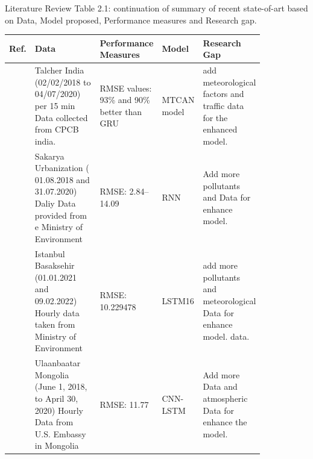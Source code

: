 \documentclass[12pt, aspectratio=169]{beamer}
\begin{document}
\begin{frame}{Literature Review}
	\centering
	\scriptsize {Table 2.1: continuation of summary of recent state-of-art based on Data,  Model proposed,  Performance measures and Research gap.}\\
	\begin{table}
		\centering
		\begin{tabular}{|p{0.03\linewidth}|p{0.29\linewidth}|p{0.15\linewidth}|p{0.16\linewidth}|p{0.21\linewidth}|}
			\hline
			\footnotesize \textbf {Ref.} & \footnotesize \textbf { Data} & \footnotesize \textbf {Performance Measures } & \footnotesize \textbf {Model} & \footnotesize \textbf {Research Gap }  \\ \hline
			\scriptsize \cite{samal2021multi}  \scriptsize & Talcher India (02/02/2018 to   04/07/2020) per 15 min Data collected from CPCB india.                    \scriptsize & RMSE values:  93\%  and 90\% better than GRU                                                              \scriptsize & MTCAN model                                                         \scriptsize & add meteorological factors and traffic data for the enhanced model.                                                               \\\hline
			\scriptsize \cite{kurnaz2022prediction}          \scriptsize & Sakarya Urbanization (   01.08.2018 and 31.07.2020) Daliy Data provided from e Ministry of Environment   \scriptsize & RMSE:  2.84–14.09                                                                                       \scriptsize & RNN                                                                 \scriptsize & Add more pollutants and Data for enhance model.    \\\hline
			\scriptsize \cite{das2022prediction}           \scriptsize & Istanbul Basaksehir (01.01.2021   and 09.02.2022) Hourly data taken from Ministry of Environment         \scriptsize & RMSE: 10.229478                                                                                          \scriptsize & LSTM16                                                              \scriptsize & add more pollutants and  meteorological Data for enhance model. data.                                          \\\hline
			\scriptsize \cite{natsagdorj2023prediction}              \scriptsize & Ulaanbaatar Mongolia  (June 1,  2018, to  April 30,  2020) Hourly Data from U.S.   Embassy in Mongolia      \scriptsize & RMSE: 11.77                                                                                              \scriptsize & CNN-LSTM                                                            \scriptsize & Add more Data and atmospheric Data for enhance the model.  \\\hline
		 \end{tabular}
	\end{table}
\end{frame}
\end{document}
